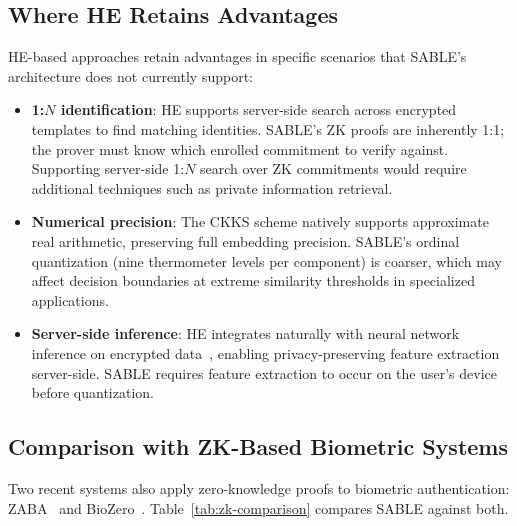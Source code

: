 \documentclass[conference]{IEEEtran}
\begin{document}
\subsection{Where HE Retains Advantages}

HE-based approaches retain advantages in specific scenarios that SABLE's architecture does not currently support:

\begin{itemize}
\item \textbf{1:$N$ identification}: HE supports server-side search across encrypted templates to find matching identities. SABLE's ZK proofs are inherently 1:1; the prover must know which enrolled commitment to verify against. Supporting server-side 1:$N$ search over ZK commitments would require additional techniques such as private information retrieval.

\item \textbf{Numerical precision}: The CKKS scheme natively supports approximate real arithmetic, preserving full embedding precision. SABLE's ordinal quantization (nine thermometer levels per component) is coarser, which may affect decision boundaries at extreme similarity thresholds in specialized applications.

\item \textbf{Server-side inference}: HE integrates naturally with neural network inference on encrypted data~\cite{wingarz2022,sun2022}, enabling privacy-preserving feature extraction server-side. SABLE requires feature extraction to occur on the user's device before quantization.
\end{itemize}

\subsection{Comparison with ZK-Based Biometric Systems}

Two recent systems also apply zero-knowledge proofs to biometric authentication: ZABA~\cite{mao2025} and BioZero~\cite{lai2024}. Table~\ref{tab:zk-comparison} compares SABLE against both.
\end{document}
